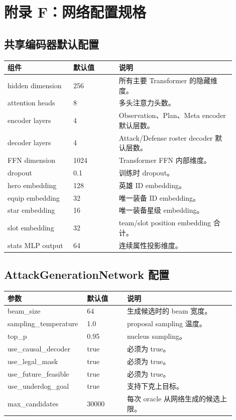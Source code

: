 \documentclass[UTF8,12pt,openany]{ctexbook}
\begin{document}
\chapter{附录 F：网络配置规格}
\section{共享编码器默认配置}
\begin{longtable}{p{0.26\linewidth}p{0.18\linewidth}p{0.46\linewidth}}
\toprule
组件 & 默认值 & 说明 \\
\midrule
hidden dimension & 256 & 所有主要 Transformer 的隐藏维度。\\
attention heads & 8 & 多头注意力头数。\\
encoder layers & 4 & Observation、Plan、Meta encoder 默认层数。\\
decoder layers & 4 & Attack/Defense roster decoder 默认层数。\\
FFN dimension & 1024 & Transformer FFN 内部维度。\\
dropout & 0.1 & 训练时 dropout。\\
hero embedding & 128 & 英雄 ID embedding。\\
equip embedding & 32 & 唯一装备 ID embedding。\\
star embedding & 16 & 唯一装备星级 embedding。\\
slot embedding & 32 & team/slot position embedding 合计。\\
stats MLP output & 64 & 连续属性投影维度。\\
\bottomrule
\end{longtable}

\section{AttackGenerationNetwork 配置}
\begin{longtable}{p{0.27\linewidth}p{0.17\linewidth}p{0.46\linewidth}}
\toprule
参数 & 默认值 & 说明 \\
\midrule
beam\_size & 64 & 生成候选时的 beam 宽度。\\
sampling\_temperature & 1.0 & proposal sampling 温度。\\
top\_p & 0.95 & nucleus sampling。\\
use\_causal\_decoder & true & 必须为 true。\\
use\_legal\_mask & true & 必须为 true。\\
use\_future\_feasible & true & 必须为 true。\\
use\_underdog\_goal & true & 支持下克上目标。\\
max\_candidates & 30000 & 每次 oracle 从网络生成的候选上限。\\
\bottomrule
\end{longtable}
\end{document}

